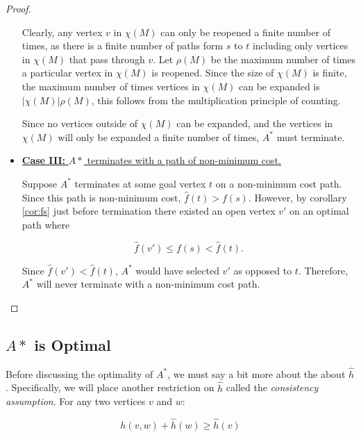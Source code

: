 \documentclass[letterpaper, 10pt]{article}
\theoremstyle{definition}
\theoremstyle{Algorithm}
\begin{document}
\begin{proof}
\begin{itemize}
      Clearly, any vertex $v$ in $\chi(M)$ can only be reopened
      a finite number of times, as there is a finite
      number of paths form $s$ to $t$ including only 
      vertices in $\chi(M)$ that pass through $v$. Let
      $\rho(M)$ be the maximum number of times a particular
      vertex in $\chi(M)$ is reopened. Since the size of
      $\chi(M)$ is finite, the maximum number of
      times vertices in $\chi(M)$ can be expanded
      is $|\chi(M)|\rho(M)$, this follows from the
      multiplication principle of counting.

      Since no vertices outside of $\chi(M)$ can be expanded,
      and the vertices in $\chi(M)$ will only be
      expanded a finite number of times, $A^*$ must terminate.

    \item \underline{\textbf{Case III:} $A*$ terminates with a path of non-minimum cost.}
     
      Suppose $A^*$ terminates at some goal vertex $t$
      on a non-minimum cost path. Since this path is
      non-minimum cost, $\hat{f}(t) > f(s)$. However, by
      corollary \ref{cor:fs} just before termination there
      existed an open vertex $v'$ on an optimal path where

      \begin{equation*}
        \hat{f}(v') \leq f(s) < \hat{f}(t).
      \end{equation*}

      Since $\hat{f}(v') < \hat{f}(t)$, $A^*$ would have
      selected $v'$ as opposed to $t$. Therefore,
      $A^*$ will never terminate with a non-minimum
      cost path.


  \end{itemize}
  

\end{proof}


\subsection{$A*$ is Optimal} %

Before discussing the optimality of $A^*$, we must say a bit
more about the about $\hat{h}$. Specifically, we will 
place another restriction on $\hat{h}$ called the
\textit{consistency assumption}. For any two vertices $v$
and $w$:

\begin{equation}\label{eq:conass}
  h(v,w) + \hat{h}(w) \geq \hat{h}(v) 
\end{equation}
\end{document}
